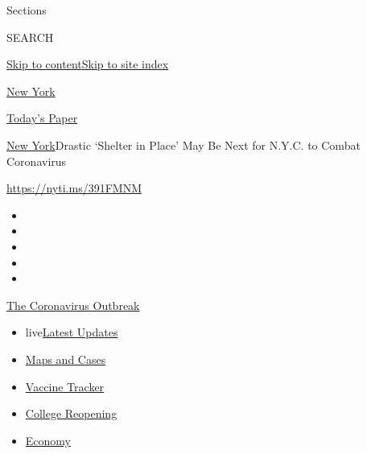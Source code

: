 Sections

SEARCH

\protect\hyperlink{site-content}{Skip to
content}\protect\hyperlink{site-index}{Skip to site index}

\href{https://www.nytimes.com/section/nyregion}{New York}

\href{https://myaccount.nytimes.com/auth/login?response_type=cookie\&client_id=vi}{}

\href{https://www.nytimes.com/section/todayspaper}{Today's Paper}

\href{/section/nyregion}{New York}\textbar{}Drastic `Shelter in Place'
May Be Next for N.Y.C. to Combat Coronavirus

\url{https://nyti.ms/391FMNM}

\begin{itemize}
\item
\item
\item
\item
\item
\end{itemize}

\href{https://www.nytimes.com/news-event/coronavirus?action=click\&pgtype=Article\&state=default\&region=TOP_BANNER\&context=storylines_menu}{The
Coronavirus Outbreak}

\begin{itemize}
\tightlist
\item
  live\href{https://www.nytimes.com/2020/08/04/world/coronavirus-cases.html?action=click\&pgtype=Article\&state=default\&region=TOP_BANNER\&context=storylines_menu}{Latest
  Updates}
\item
  \href{https://www.nytimes.com/interactive/2020/us/coronavirus-us-cases.html?action=click\&pgtype=Article\&state=default\&region=TOP_BANNER\&context=storylines_menu}{Maps
  and Cases}
\item
  \href{https://www.nytimes.com/interactive/2020/science/coronavirus-vaccine-tracker.html?action=click\&pgtype=Article\&state=default\&region=TOP_BANNER\&context=storylines_menu}{Vaccine
  Tracker}
\item
  \href{https://www.nytimes.com/2020/08/02/us/covid-college-reopening.html?action=click\&pgtype=Article\&state=default\&region=TOP_BANNER\&context=storylines_menu}{College
  Reopening}
\item
  \href{https://www.nytimes.com/live/2020/08/04/business/stock-market-today-coronavirus?action=click\&pgtype=Article\&state=default\&region=TOP_BANNER\&context=storylines_menu}{Economy}
\end{itemize}

